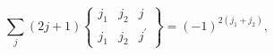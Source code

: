 \[\sum_{j}(2j+1)\begin{Bmatrix}j_{1}&j_{2}&j\\
j_{1}&j_{2}&j^{\prime}\end{Bmatrix}=(-1)^{2(j_{1}+j_{2})},\]